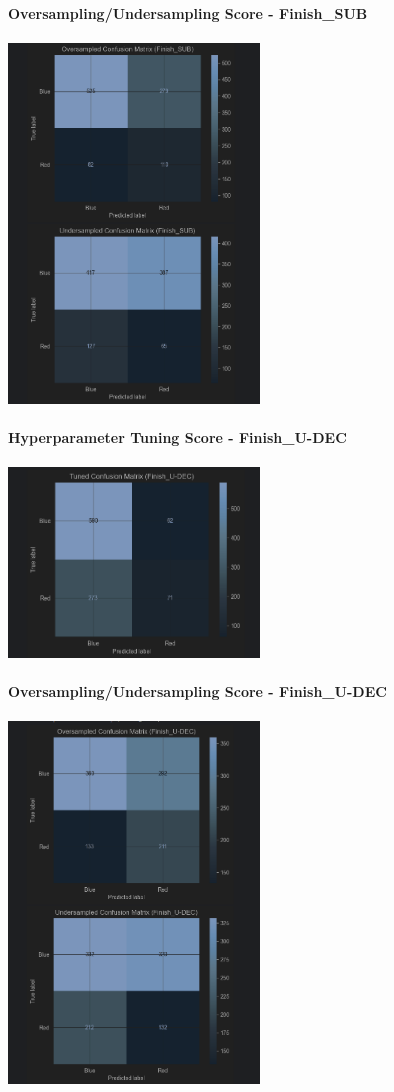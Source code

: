 \documentclass{article}
\begin{document}
	{\large \textbf{Oversampling/Undersampling Score - Finish\_SUB}}\\\\
	\includegraphics[width=0.5\textwidth]{images/CM_U_O_SUB.png}\\\\
	\newpage
	{\large \textbf{Hyperparameter Tuning Score - Finish\_U-DEC}}\\\\
	\includegraphics[width=0.5\textwidth]{images/CM_Hyp_U-DEC.png}\\\\
	{\large \textbf{Oversampling/Undersampling Score - Finish\_U-DEC}}\\\\
	\includegraphics[width=0.5\textwidth]{images/CM_U_O_U-DEC.png}\\\\
	\newpage
\end{document}
